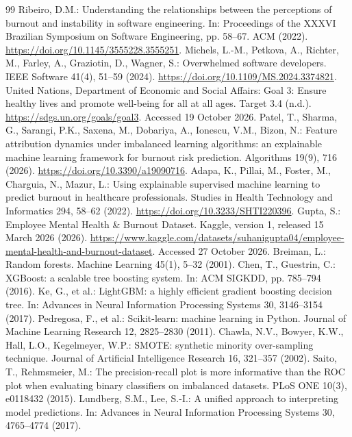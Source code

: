 \documentclass[runningheads]{llncs}
\begin{document}
\begin{thebibliography}{99}
 Ribeiro, D.M.: Understanding the relationships between the perceptions of burnout and instability in software engineering. In: Proceedings of the XXXVI Brazilian Symposium on Software Engineering, pp. 58--67. ACM (2022). \url{https://doi.org/10.1145/3555228.3555251}.
 Michels, L.-M., Petkova, A., Richter, M., Farley, A., Graziotin, D., Wagner, S.: Overwhelmed software developers. IEEE Software 41(4), 51--59 (2024). \url{https://doi.org/10.1109/MS.2024.3374821}.
 United Nations, Department of Economic and Social Affairs: Goal 3: Ensure healthy lives and promote well-being for all at all ages. Target 3.4 (n.d.). \url{https://sdgs.un.org/goals/goal3}. Accessed 19 October 2026.
 Patel, T., Sharma, G., Sarangi, P.K., Saxena, M., Dobariya, A., Ionescu, V.M., Bizon, N.: Feature attribution dynamics under imbalanced learning algorithms: an explainable machine learning framework for burnout risk prediction. Algorithms 19(9), 716 (2026). \url{https://doi.org/10.3390/a19090716}.
 Adapa, K., Pillai, M., Foster, M., Charguia, N., Mazur, L.: Using explainable supervised machine learning to predict burnout in healthcare professionals. Studies in Health Technology and Informatics 294, 58--62 (2022). \url{https://doi.org/10.3233/SHTI220396}.
 Gupta, S.: Employee Mental Health \& Burnout Dataset. Kaggle, version 1, released 15 March 2026 (2026). \url{https://www.kaggle.com/datasets/suhanigupta04/employee-mental-health-and-burnout-dataset}. Accessed 27 October 2026.
 Breiman, L.: Random forests. Machine Learning 45(1), 5--32 (2001).
 Chen, T., Guestrin, C.: XGBoost: a scalable tree boosting system. In: ACM SIGKDD, pp. 785--794 (2016).
 Ke, G., et al.: LightGBM: a highly efficient gradient boosting decision tree. In: Advances in Neural Information Processing Systems 30, 3146--3154 (2017).
 Pedregosa, F., et al.: Scikit-learn: machine learning in Python. Journal of Machine Learning Research 12, 2825--2830 (2011).
 Chawla, N.V., Bowyer, K.W., Hall, L.O., Kegelmeyer, W.P.: SMOTE: synthetic minority over-sampling technique. Journal of Artificial Intelligence Research 16, 321--357 (2002).
 Saito, T., Rehmsmeier, M.: The precision-recall plot is more informative than the ROC plot when evaluating binary classifiers on imbalanced datasets. PLoS ONE 10(3), e0118432 (2015).
 Lundberg, S.M., Lee, S.-I.: A unified approach to interpreting model predictions. In: Advances in Neural Information Processing Systems 30, 4765--4774 (2017).
\end{thebibliography}
\end{document}
